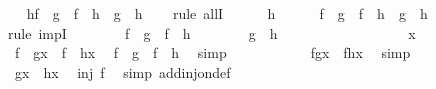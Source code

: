\begin{isabellebody}
\ \ \isamarkupfalse%
\ {\isachardoublequoteopen}{\isasymforall}h{\isachardot}{\isacharparenleft}f\ {\isasymcirc}\ g\ {\isacharequal}\ f\ {\isasymcirc}\ h{\isacharparenright}\ {\isasymlongrightarrow}\ {\isacharparenleft}g\ {\isacharequal}\ h{\isacharparenright}{\isachardoublequoteclose}\isanewline
\ \ \isamarkupfalse%
\ {\isacharparenleft}rule\ allI{\isacharparenright}\isanewline
\ \ \ \ \isamarkupfalse%
\ h\isanewline
\ \ \ \ \isamarkupfalse%
\ {\isachardoublequoteopen}f\ {\isasymcirc}\ g\ {\isacharequal}\ f\ {\isasymcirc}\ h\ {\isasymlongrightarrow}\ {\isacharparenleft}g\ {\isacharequal}\ h{\isacharparenright}{\isachardoublequoteclose}\isanewline
\ \ \ \ \isamarkupfalse%
\ {\isacharparenleft}rule\ impI{\isacharparenright}\isanewline
\ \ \ \ \ \ \isamarkupfalse%
\ {\isachardoublequoteopen}f\ {\isasymcirc}\ g\ {\isacharequal}\ f\ {\isasymcirc}\ h{\isachardoublequoteclose}\isanewline
\ \ \ \ \ \ \isamarkupfalse%
\ {\isachardoublequoteopen}g\ {\isacharequal}\ h{\isachardoublequoteclose}\isanewline
\ \ \ \ \ \ \isamarkupfalse%
\ \isanewline
\ \ \ \ \ \ \ \ \isamarkupfalse%
\ x\isanewline
\ \ \ \ \ \ \ \ \isamarkupfalse%
\ \ {\isachardoublequoteopen}{\isacharparenleft}f\ {\isasymcirc}\ g{\isacharparenright}{\isacharparenleft}x{\isacharparenright}\ {\isacharequal}\ {\isacharparenleft}f\ {\isasymcirc}\ h{\isacharparenright}{\isacharparenleft}x{\isacharparenright}{\isachardoublequoteclose}\ \isamarkupfalse%
\ {\isacharbackquoteopen}f\ {\isasymcirc}\ g\ {\isacharequal}\ f\ {\isasymcirc}\ h{\isacharbackquoteclose}\ \isamarkupfalse%
\ simp\isanewline
\ \ \ \ \ \ \ \ \isamarkupfalse%
\ \isamarkupfalse%
\ {\isachardoublequoteopen}f{\isacharparenleft}g{\isacharparenleft}x{\isacharparenright}{\isacharparenright}\ {\isacharequal}\ f{\isacharparenleft}h{\isacharparenleft}x{\isacharparenright}{\isacharparenright}{\isachardoublequoteclose}\ \isamarkupfalse%
\ simp\isanewline
\ \ \ \ \ \ \ \ \isamarkupfalse%
\ \ {\isachardoublequoteopen}g{\isacharparenleft}x{\isacharparenright}\ {\isacharequal}\ h{\isacharparenleft}x{\isacharparenright}{\isachardoublequoteclose}\ \isamarkupfalse%
\ {\isacharbackquoteopen}inj\ f{\isacharbackquoteclose}\ \isamarkupfalse%
\ {\isacharparenleft}simp\ add{\isacharcolon}inj{\isacharunderscore}on{\isacharunderscore}def{\isacharparenright}\isanewline

\end{isabellebody}
